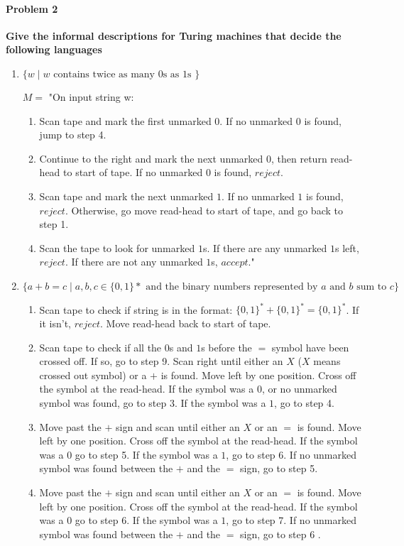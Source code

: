 \documentclass{article}
\begin{document}
\paragraph{Problem 2}
\textbf{Give the informal descriptions for Turing machines that decide the following languages}
\begin{enumerate}[\indent a)]
    \item $\{w \;|\; w \text{ contains twice as many 0s as 1s }\}$
    
	$M = $ "On input string w:
	\begin{enumerate}[\indent 1.]
		\item Scan tape and mark the first unmarked $0$. If no unmarked $0$ is found, jump to step 4.
		\item Continue to the right and mark the next unmarked $0$, then return read-head to start of tape. If no unmarked $0$ is found, $reject$.
		\item Scan tape and mark the next unmarked $1$. If no unmarked $1$ is found, $reject$. Otherwise, go move read-head to start of tape, and go back to step 1.
		\item Scan the tape to look for unmarked $1$s. If there are any unmarked $1$s left, $reject$. If there are not any unmarked $1$s, $accept$."	
    \end{enumerate}


    \item $\{a+b=c \;|\; a,b,c \in \{0,1\}* \text{ and the binary numbers represented by $a$ 
    and $b$ sum to $c$} \}$
    
    \begin{enumerate}[\indent 1.]
		\item Scan tape to check if string is in the format: $\{0,1\}^* + \{0,1\}^* = \{0,1\}^* $. If it isn't, $reject$. Move read-head back to start of tape.
		\item Scan tape to check if all the $0$s and $1$s  before the $=$ symbol have been crossed off. If so, go to step 9. Scan right until either an $X$ ($X$ means crossed out symbol) or a $+$ is found. Move left by one position. Cross off the symbol at the read-head. If the symbol was a $0$, or no unmarked symbol was found, go to step 3. If the symbol was a $1$, go to step 4.
		
		
		\item Move past the $+$ sign and scan until either an $X$ or an $=$ is found. Move left by one position. Cross off the symbol at the read-head. If the symbol was a $0$ go to step 5. If the symbol was a $1$, go to step 6. If no unmarked symbol was found between the $+$ and the $=$ sign, go to step 5.
		\item Move past the $+$ sign and scan until either an $X$ or an $=$ is found. Move left by one position. Cross off the symbol at the read-head. If the symbol was a $0$ go to step 6. If the symbol was a $1$, go to step 7. If no unmarked symbol was found between the $+$ and the $=$ sign, go to step 6 .
		

\end{enumerate}
\end{enumerate}
\end{document}
